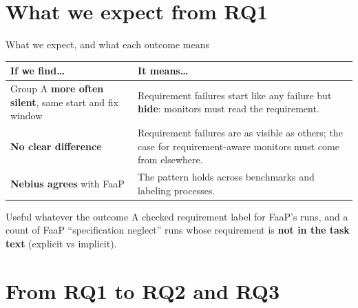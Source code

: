 \documentclass[aspectratio=169,11pt]{beamer}
\begin{document}
\section{What we expect from RQ1}

\begin{frame}{What we expect, and what each outcome means}
  \small
  \begin{tabularx}{\textwidth}{@{}>{\raggedright\arraybackslash}p{}L@{}}
    \toprule
    \textbf{If we find\dots} & \textbf{It means\dots} \\
    \midrule
    Group A \textbf{more often silent}, same start and fix window
      & Requirement failures start like any failure but \textbf{hide}: monitors must read the requirement. \\
    \textbf{No clear difference}
      & Requirement failures are as visible as others; the case for requirement-aware monitors must come from elsewhere. \\
    \textbf{Nebius agrees} with FaaP
      & The pattern holds across benchmarks and labeling processes. \\
    \bottomrule
  \end{tabularx}
  \vspace{6pt}
  \begin{block}{Useful whatever the outcome}
    A checked requirement label for FaaP's runs, and a count of FaaP ``specification neglect'' runs whose requirement
    is \textbf{not in the task text} (explicit vs implicit).
  \end{block}
\end{frame}

\section{From RQ1 to RQ2 and RQ3}
\end{document}
